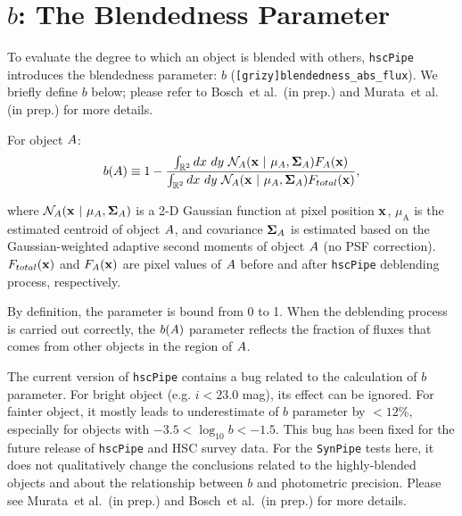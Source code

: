 \documentclass[useamsfonts]{pasj01}
\def\etal{{\ et al.~}}
\def\hscpipe{\texttt{hscPipe}}
\def\synpipe{\texttt{SynPipe}}
\begin{document}

\section{$b$: The Blendedness Parameter}
    \label{app:defineb}

    To evaluate the degree to which an object is blended with others, \hscpipe{} 
    introduces the blendedness parameter: $b$ (\texttt{[grizy]blendedness\_abs\_flux}).
    We briefly define  $b$ below; please refer to Bosch\etal (in prep.) and Murata\etal 
    (in prep.) for more details.

    For object ${\rm A}$:
    \begin{eqnarray*}
        b({\rm A}) \equiv
        1-\frac{\int_{\mathbb{R}^2} {\rm d}x~ {\rm d}y\ \mathcal{N}_{\mathrm{A}}({\bf x}\ |\  \mu_{\mathrm{A}}, {\bf\Sigma}_{\mathrm{A}})
        F_{\mathrm{A}}({\bf x})}{\int_{\mathbb{R}^2} {\rm d}x~ {\rm d}y\ \mathcal{N}_{\mathrm{A}}({\bf x}\ |\  \mu_{\mathrm{A}},
        {\bf\Sigma}_{\rm{A}}) F_{\rm{total}}({\bf x})},
        \label{eq:defineb}
    \end{eqnarray*}

    \noindent
    where $\mathcal{N}_{\rm{A}}({ \bf x }\ |\  \mu_{\rm{A}}, {\bf\Sigma}_{\rm{A}})$
    is a 2-D Gaussian function at pixel position $\bf x$, $\mu_{\mathrm{A}}$ is the
    estimated centroid of object ${\rm A}$, and covariance ${\bf \Sigma}_{\mathrm{A}}$
    is estimated based on the Gaussian-weighted adaptive second moments of object
    ${\rm A}$ (no PSF correction).
    $F_{\mathrm{total}}({\bf x })$ and $F_{\rm{A}}({\bf x })$ are pixel values of
    ${\rm A}$ before and after \hscpipe{} deblending process, respectively.

    By definition, the parameter is bound from 0 to 1.
    When the deblending process is carried out correctly, the $b({\rm A})$ parameter
    reflects the fraction of fluxes that comes from other objects in the
    region of ${\rm A}$.
    
    The current version of \hscpipe{} contains a bug related to the calculation of $b$
    parameter. 
    For bright object (e.g. $i<23.0$ mag), its effect can be ignored.  
    For fainter object, it mostly leads to underestimate of $b$ parameter by $< 12$\%, 
    especially for objects with $-3.5 < \log_{10} b < -1.5$. 
    This bug has been fixed for the future release of \hscpipe{} and HSC survey data. 
    For the \synpipe{} tests here, it does not qualitatively change the conclusions 
    related to the highly-blended objects and about the relationship between $b$ and
    photometric precision. 
    Please see Murata\etal (in prep.) and Bosch\etal (in prep.) for more details. 
    

\label{lastpage}
\end{document}
